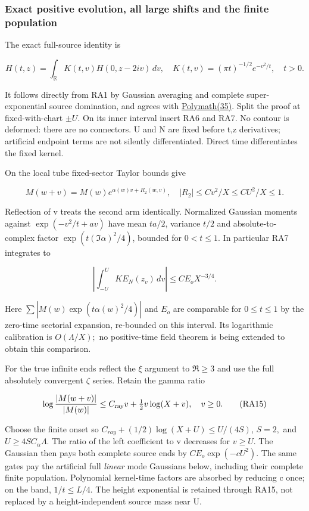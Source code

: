 \subsubsection{Exact positive evolution, all large shifts and the finite population}
\label{subsec:ra-3}

The exact full-source identity is

\[
H(t,z)=\int_{\mathbb R}K(t,v)H(0,z-2iv)\,dv,
\quad K(t,v)=(\pi t)^{-1/2}e^{-v^2/t},\quad t>0.
\tag{RA12}\label{eq:ansatz-ra12}
\]

It follows directly from RA1 by Gaussian averaging and complete super-exponential source domination, and agrees with \href{https://arxiv.org/html/1904.12438v2#S4}{Polymath(35)}. Split the proof at fixed-with-chart \(\pm U\). On its inner interval insert RA6 and RA7. No contour is deformed: there are no connectors. U and N are fixed before t,z derivatives; artificial endpoint terms are not silently differentiated. Direct time differentiates the fixed kernel.

On the local tube fixed-sector Taylor bounds give

\[
M(w+v)=M(w)e^{\alpha(w)v+R_2(w,v)},\quad
|R_2|\le C v^2/X\le C U^2/X\le1.
\tag{RA13}\label{eq:ansatz-ra13}
\]

Reflection of v treats the second arm identically. Normalized Gaussian moments against \(\exp(-v^{2}/t+a v)\) have mean \(ta/2\), variance \(t/2\) and absolute-to-complex factor \(\exp(t(\Im \alpha)^{2}/4)\), bounded for \(0<t\le 1\). In particular RA7 integrates to

\[
\left|\int_{-U}^UK E_N(z_v)\,dv\right|
 \le C E_o X^{-3/4}.
\tag{RA14}\label{eq:ansatz-ra14}
\]

Here \(\sum |M(w)\exp(t \alpha(w)^{2}/4)|\) and \(E_{o}\) are comparable for \(0\le t\le 1\) by the zero-time sectorial expansion, re-bounded on this interval. Its logarithmic calibration is \(O(\Lambda/X);\) no positive-time field theorem is being extended to obtain this comparison.

For the true infinite ends reflect the \(\xi\) argument to \(\Re\ge 3\) and use the full absolutely convergent \(\zeta\) series. Retain the gamma ratio

\[
\log\frac{|M(w+v)|}{|M(w)|}
 \le C_{\rm ray}v+\tfrac12v\log(X+v),\quad v\ge0.
\tag{RA15}\label{eq:ansatz-ra15}
\]

Choose the finite onset so \(C_{ray}+(1/2)\log(X+U)\le U/(4S)\), \(S=2,\) and \(U\ge 4S C_{\alpha} \Lambda\). The ratio of the left coefficient to v decreases for \(v\ge U.\) The Gaussian then pays both complete source ends by \(C E_{o} \exp(-cU^{2})\). The same gates pay the artificial full \emph{linear} mode Gaussians below, including their complete finite population. Polynomial kernel-time factors are absorbed by reducing c once; on the band, \(1/t\le L/4\). The height exponential is retained through RA15, not replaced by a height-independent source mass near U.

